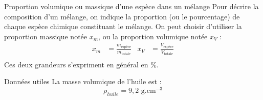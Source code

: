 \begin{doc}{Proportion volumique ou massique d’une espèce dans un mélange}
Pour décrire la composition d’un mélange, on indique la proportion (ou le pourcentage) de chaque espèce chimique constituant le mélange. On peut choisir d’utiliser la proportion massique notée $x_m$, ou la proportion volumique notée $x_V$ :
\begin{align*}
    x_m &= \frac{m_{\text{espèce}}}{m_{\text{totale}}} & x_V & = \frac{V_{\text{espèce}}}{V_{\text{totale}}}\\
\end{align*}
Ces deux grandeurs s'expriment en général en \%.
\end{doc}

\begin{doc}{Données utiles}
La masse volumique de l'huile est :
\begin{equation*}
    \rho_{huile} = 9,2 \text{~g.cm$^{-3}$}
    \end{equation*}
\end{doc}

